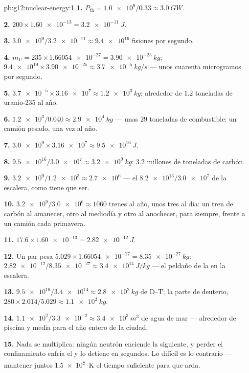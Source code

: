 \begin{solution}{pb:g12:nuclear-energy:1}
\textbf{1.} $P_{\text{th}} = \num{1.0e9}/0.33 \approx \qty{3.0}{GW}$.

\textbf{2.} $200 \times \num{1.60e-13} = \qty{3.2e-11}{J}$.

\textbf{3.} $\num{3.0e9}/\num{3.2e-11} \approx \num{9.4e19}$ fisiones
por segundo.

\textbf{4.} $m_{\mathrm U} = 235 \times \num{1.66054e-27} =
\qty{3.90e-25}{kg}$; $\num{9.4e19} \times \num{3.90e-25} \approx
\qty{3.7e-5}{kg/s}$ --- unos cuarenta microgramos por segundo.

\textbf{5.} $\num{3.7e-5} \times \num{3.16e7} \approx \qty{1.2e3}{kg}$:
alrededor de $1.2$ toneladas de uranio-235 al año.

\textbf{6.} $\num{1.2e3}/0.040 \approx \qty{2.9e4}{kg}$ --- unas $29$
toneladas de combustible: un camión pesado, una vez al año.

\textbf{7.} $\num{3.0e9} \times \num{3.16e7} \approx \qty{9.5e16}{J}$.

\textbf{8.} $\num{9.5e16}/\num{3.0e7} \approx \qty{3.2e9}{kg}$: $3.2$
millones de toneladas de carbón.

\textbf{9.} $\num{3.2e9}/\num{1.2e3} \approx \num{2.7e6}$ --- el
$\num{8.2e13}/\num{3.0e7}$ de la escalera, como tiene que ser.

\textbf{10.} $\num{3.2e9}/\num{3.0e6} \approx 1060$ trenes al año, unos
tres al día: un tren de carbón al amanecer, otro al mediodía y otro al
anochecer, para siempre, frente a un camión cada primavera.

\textbf{11.} $17.6 \times \num{1.60e-13} = \qty{2.82e-12}{J}$.

\textbf{12.} Un par pesa $5.029 \times \num{1.66054e-27} =
\qty{8.35e-27}{kg}$: $\num{2.82e-12}/\num{8.35e-27} \approx
\qty{3.4e14}{J/kg}$ --- el peldaño de la  en la escalera.

\textbf{13.} $\num{9.5e16}/\num{3.4e14} \approx \qty{2.8e2}{kg}$ de
D--T; la parte de deuterio,
$280 \times 2.014/5.029 \approx \qty{1.1e2}{kg}$.

\textbf{14.} $\num{1.1e2}/\num{3.3e-2} \approx \qty{3.4e3}{m^3}$ de agua
de mar --- alrededor de piscina y media para el año entero de la ciudad.

\textbf{15.} Nada se multiplica: ningún neutrón enciende la 
siguiente, y perder el confinamiento enfría el  y lo detiene en
segundos. Lo difícil es lo contrario --- mantener juntos
\qty{1.5e8}{K} el tiempo suficiente para que arda.


\end{solution}
